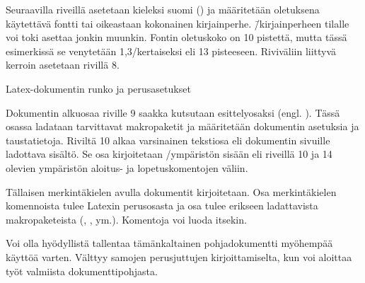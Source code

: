 Seuraavilla riveillä asetetaan kieleksi suomi () ja
määritetään oletuksena käytettävä fontti tai oikeastaan kokonainen
kirjainperhe.  \=/kirjainperheen tilalle
voi toki asettaa jonkin muunkin. Fontin oletuskoko on 10 pistettä, mutta
tässä esimerkissä se venytetään 1,3\-/kertaiseksi eli 13 pisteeseen.
Riviväliin liittyvä kerroin asetetaan rivillä 8.

\begin{esimerkki*}

\caption{Latex-dokumentin runko ja perus\-asetukset}
\label{esim:ensimmainen}
\end{esimerkki*}

Dokumentin alkuosaa riville 9 saakka kutsutaan esittelyosaksi (engl.
). Tässä osassa ladataan tarvittavat makropaketit ja
määritetään dokumentin asetuksia ja taustatietoja. Riviltä 10 alkaa
varsinainen tekstiosa eli dokumentin sivuille ladottava sisältö. Se osa
kirjoitetaan \-/ympäristön sisään eli riveillä 10
ja 14 olevien ympäristön aloi\-tus- ja lopetuskomentojen väliin.

Tällaisen merkintäkielen avulla dokumentit kirjoitetaan. Osa
merkintäkielen komennoista tulee Latexin perusosasta ja osa tulee
erikseen ladattavista makropaketeista (,
,  ym.). Komentoja voi luoda
itsekin.

Voi olla hyödyllistä tallentaa tämänkaltainen pohjadokumentti myöhempää
käyttöä varten. Välttyy samojen perusjuttujen kirjoittamiselta, kun voi
aloittaa työt valmiista dokumenttipohjasta.
